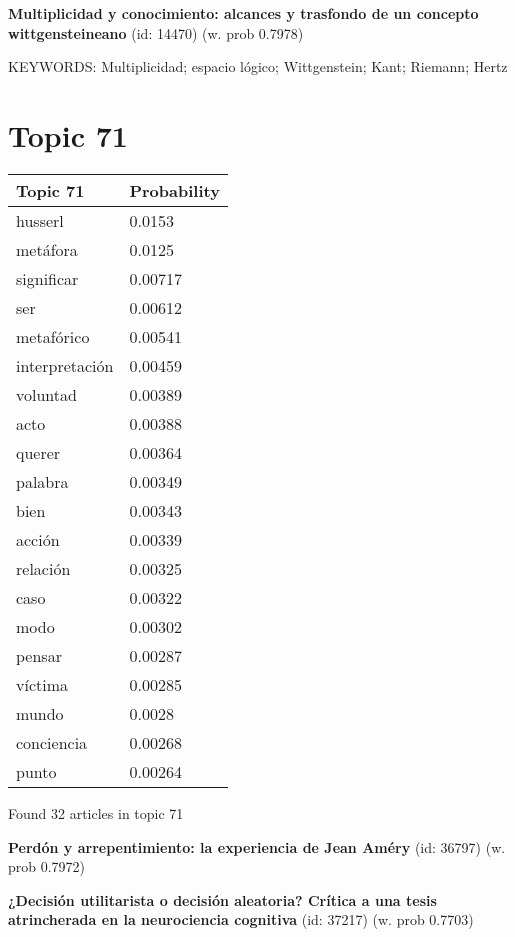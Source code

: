 \documentclass{article}
\begin{document}
\textbf{Multiplicidad y conocimiento: alcances y trasfondo de un concepto wittgensteineano} (id: 14470)
 (w. prob 0.7978)


KEYWORDS:
Multiplicidad; espacio lógico; Wittgenstein; Kant; Riemann; Hertz

\vfill
\newpage


\centering
\thispagestyle{empty}
\section*{Topic 71}\vfill
\begin{tabular}{ll}
\toprule
       Topic 71 & Probability \\
\midrule
        husserl &      0.0153 \\
       metáfora &      0.0125 \\
     significar &     0.00717 \\
            ser &     0.00612 \\
     metafórico &     0.00541 \\
 interpretación &     0.00459 \\
       voluntad &     0.00389 \\
           acto &     0.00388 \\
         querer &     0.00364 \\
        palabra &     0.00349 \\
           bien &     0.00343 \\
         acción &     0.00339 \\
       relación &     0.00325 \\
           caso &     0.00322 \\
           modo &     0.00302 \\
         pensar &     0.00287 \\
        víctima &     0.00285 \\
          mundo &      0.0028 \\
     conciencia &     0.00268 \\
          punto &     0.00264 \\
\bottomrule
\end{tabular}

\vfill
Found 32 articles in topic 71
\vfill

\textbf{Perdón y arrepentimiento: la experiencia de Jean Améry} (id: 36797)
 (w. prob 0.7972)
\vfill

\textbf{¿Decisión utilitarista o decisión aleatoria? Crítica a una tesis atrincherada en la neurociencia cognitiva} (id: 37217)
 (w. prob 0.7703)
\vfill
\end{document}
